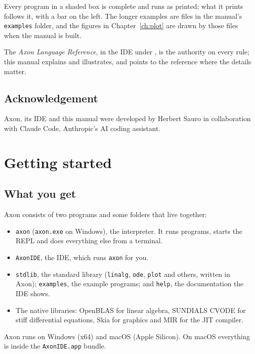 \documentclass[11pt,a4paper,openany]{report}
\begin{document}
Every program in a shaded box is complete and runs as printed; what it prints
follows it, with a bar on the left. The longer examples are files in the
manual's \texttt{examples} folder, and the figures in Chapter~\ref{ch:plot} are
drawn by those files when the manual is built.

The \emph{Axon Language Reference}, in the IDE under , is the authority on every rule; this manual explains and
illustrates, and points to the reference where the details matter.

\section*{Acknowledgement}

Axon, its IDE and this manual were developed by Herbert Sauro in collaboration
with Claude Code, Anthropic's AI coding assistant.

\chapter{Getting started}\label{ch:start}

\section{What you get}

Axon consists of two programs and some folders that live together:

\begin{itemize}
\item \texttt{axon} (\texttt{axon.exe} on Windows), the interpreter. It runs
  programs, starts the REPL and does everything else from a terminal.
\item \texttt{AxonIDE}, the IDE, which runs \texttt{axon} for you.
\item \texttt{stdlib}, the standard library (\texttt{linalg}, \texttt{ode},
  \texttt{plot} and others, written in Axon); \texttt{examples}, the example
  programs; and \texttt{help}, the documentation the IDE shows.
\item The native libraries: OpenBLAS for linear algebra, SUNDIALS CVODE for
  stiff differential equations, Skia for graphics and MIR for the JIT compiler.
\end{itemize}

Axon runs on Windows (x64) and macOS (Apple Silicon). On macOS everything is
inside the \texttt{AxonIDE.app} bundle.
\end{document}
